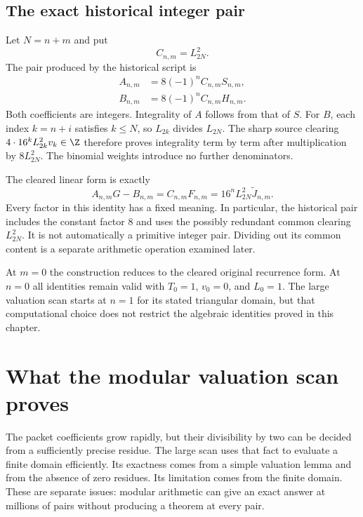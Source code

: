 \section{The exact historical integer pair}

Let $N=n+m$ and put
\begin{equation}\label{cb_eq_C_clear}
 C_{n,m}=L_{2N}^2.
\end{equation}
The pair produced by the historical script is
\begin{align}
 A_{n,m}&=8(-1)^nC_{n,m}S_{n,m},\label{cb_eq_historical_A}\\
 B_{n,m}&=8(-1)^nC_{n,m}H_{n,m}.
 \label{cb_eq_historical_B}
\end{align}
Both coefficients are integers. Integrality of $A$ follows from that of
$S$. For $B$, each index $k=n+i$ satisfies $k\leq N$, so $L_{2k}$ divides
$L_{2N}$. The sharp source clearing
$4\cdot16^kL_{2k}^2v_k\in\Z$ therefore proves integrality term by term
after multiplication by $8L_{2N}^2$. The binomial weights introduce no
further denominators.

The cleared linear form is exactly
\begin{equation}\label{cb_eq_cleared_integral}
 A_{n,m}G-B_{n,m}
 =C_{n,m}F_{n,m}
 =16^nL_{2N}^2\widetilde J_{n,m}.
\end{equation}
Every factor in this identity has a fixed meaning. In particular, the
historical pair includes the constant factor $8$ and uses the possibly
redundant common clearing $L_{2N}^2$. It is not automatically a primitive
integer pair. Dividing out its common content is a separate arithmetic
operation examined later.

At $m=0$ the construction reduces to the cleared original recurrence form.
At $n=0$ all identities remain valid with $T_0=1$, $v_0=0$, and $L_0=1$.
The large valuation scan starts at $n=1$ for its stated triangular domain,
but that computational choice does not restrict the algebraic identities
proved in this chapter.

\chapter{What the modular valuation scan proves}
\label{cb_ch_modular}

The packet coefficients grow rapidly, but their divisibility by two can be
decided from a sufficiently precise residue. The large scan uses that fact
to evaluate a finite domain efficiently. Its exactness comes from a simple
valuation lemma and from the absence of zero residues. Its limitation comes
from the finite domain. These are separate issues: modular arithmetic can
give an exact answer at millions of pairs without producing a theorem at
every pair.

